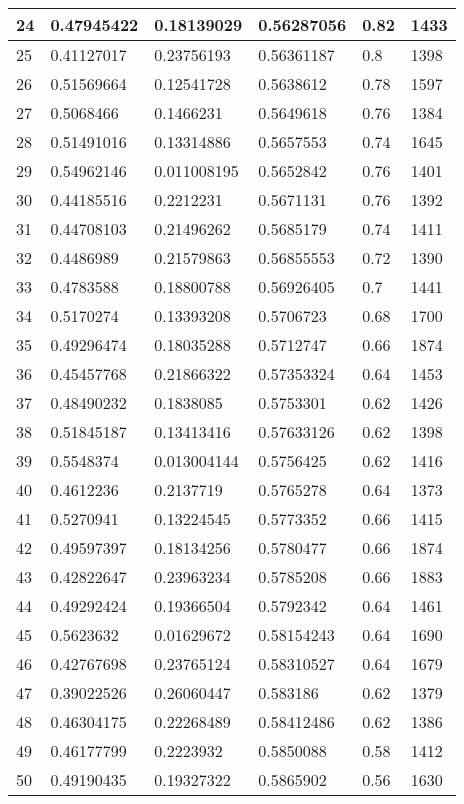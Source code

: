 \begin{longtable}{|l|l|l|l|l|l|}
24 & 0.47945422 & 0.18139029 & 0.56287056 & 0.82 & 1433 \\ \hline 
25 & 0.41127017 & 0.23756193 & 0.56361187 & 0.8 & 1398 \\ \hline 
26 & 0.51569664 & 0.12541728 & 0.5638612 & 0.78 & 1597 \\ \hline 
27 & 0.5068466 & 0.1466231 & 0.5649618 & 0.76 & 1384 \\ \hline 
28 & 0.51491016 & 0.13314886 & 0.5657553 & 0.74 & 1645 \\ \hline 
29 & 0.54962146 & 0.011008195 & 0.5652842 & 0.76 & 1401 \\ \hline 
30 & 0.44185516 & 0.2212231 & 0.5671131 & 0.76 & 1392 \\ \hline 
31 & 0.44708103 & 0.21496262 & 0.5685179 & 0.74 & 1411 \\ \hline 
32 & 0.4486989 & 0.21579863 & 0.56855553 & 0.72 & 1390 \\ \hline 
33 & 0.4783588 & 0.18800788 & 0.56926405 & 0.7 & 1441 \\ \hline 
34 & 0.5170274 & 0.13393208 & 0.5706723 & 0.68 & 1700 \\ \hline 
35 & 0.49296474 & 0.18035288 & 0.5712747 & 0.66 & 1874 \\ \hline 
36 & 0.45457768 & 0.21866322 & 0.57353324 & 0.64 & 1453 \\ \hline 
37 & 0.48490232 & 0.1838085 & 0.5753301 & 0.62 & 1426 \\ \hline 
38 & 0.51845187 & 0.13413416 & 0.57633126 & 0.62 & 1398 \\ \hline 
39 & 0.5548374 & 0.013004144 & 0.5756425 & 0.62 & 1416 \\ \hline 
40 & 0.4612236 & 0.2137719 & 0.5765278 & 0.64 & 1373 \\ \hline 
41 & 0.5270941 & 0.13224545 & 0.5773352 & 0.66 & 1415 \\ \hline 
42 & 0.49597397 & 0.18134256 & 0.5780477 & 0.66 & 1874 \\ \hline 
43 & 0.42822647 & 0.23963234 & 0.5785208 & 0.66 & 1883 \\ \hline 
44 & 0.49292424 & 0.19366504 & 0.5792342 & 0.64 & 1461 \\ \hline 
45 & 0.5623632 & 0.01629672 & 0.58154243 & 0.64 & 1690 \\ \hline 
46 & 0.42767698 & 0.23765124 & 0.58310527 & 0.64 & 1679 \\ \hline 
47 & 0.39022526 & 0.26060447 & 0.583186 & 0.62 & 1379 \\ \hline 
48 & 0.46304175 & 0.22268489 & 0.58412486 & 0.62 & 1386 \\ \hline 
49 & 0.46177799 & 0.2223932 & 0.5850088 & 0.58 & 1412 \\ \hline 
50 & 0.49190435 & 0.19327322 & 0.5865902 & 0.56 & 1630 \\ \hline 
\end{longtable}